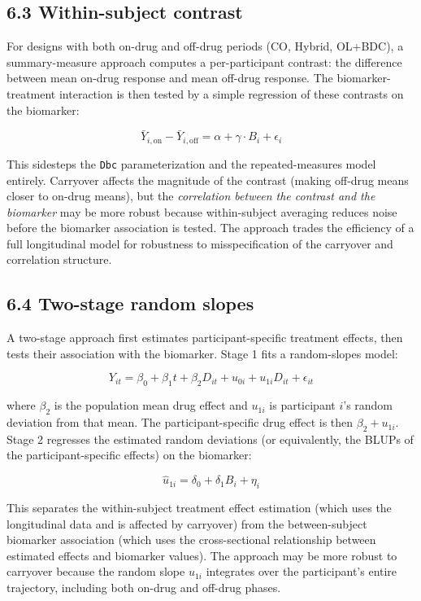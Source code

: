 \documentclass[11pt]{article}
\begin{document}
\subsection{6.3 Within-subject contrast}

For designs with both on-drug and off-drug periods (CO, Hybrid,
OL+BDC), a summary-measure approach computes a per-participant
contrast: the difference between mean on-drug response and mean
off-drug response. The biomarker-treatment interaction is then
tested by a simple regression of these contrasts on the biomarker:

\[\bar{Y}_{i,\text{on}} - \bar{Y}_{i,\text{off}} = \alpha +
\gamma \cdot B_i + \epsilon_i\]

This sidesteps the \texttt{Dbc} parameterization and the
repeated-measures model entirely. Carryover affects the
magnitude
of the contrast (making off-drug means closer to on-drug means),
but the \textit{correlation between the contrast and the biomarker} may
be more robust because within-subject averaging reduces noise
before the biomarker association is tested. The approach trades
the efficiency of a full longitudinal model for robustness to
misspecification of the carryover and correlation structure.

\subsection{6.4 Two-stage random slopes}

A two-stage approach first estimates participant-specific
treatment effects, then tests their association with the
biomarker. Stage 1 fits a random-slopes model:

\[Y_{it} = \beta_0 + \beta_1 t + \beta_2 D_{it} + u_{0i} +
u_{1i} D_{it} + \epsilon_{it}\]

where $\beta_2$ is the population mean drug effect and $u_{1i}$
is participant $i$'s random deviation from that mean. The
participant-specific drug effect is then $\beta_2 + u_{1i}$.
Stage 2 regresses the estimated random deviations (or
equivalently, the BLUPs of the participant-specific effects) on
the biomarker:

\[\hat{u}_{1i} = \delta_0 + \delta_1 B_i + \eta_i\]

This separates the within-subject treatment effect estimation
(which uses the longitudinal data and is affected by carryover)
from the between-subject biomarker association (which uses the
cross-sectional relationship between estimated effects and
biomarker values). The approach may be more robust to carryover
because the random slope $u_{1i}$ integrates over the
participant's entire trajectory, including both on-drug and
off-drug phases.
\end{document}

